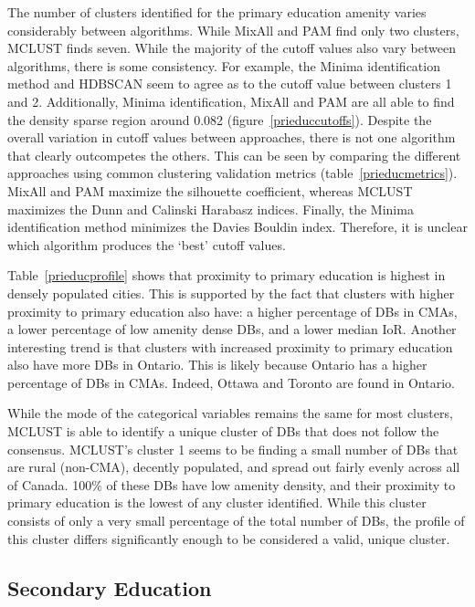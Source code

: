 \documentclass[11pt, a4paper]{article}
\begin{document}
The number of clusters identified for the primary education amenity varies considerably between algorithms. While MixAll and PAM find only two clusters, MCLUST finds seven. While the majority of the cutoff values also vary between algorithms, there is some consistency. For example, the Minima identification method and HDBSCAN seem to agree as to the cutoff value between clusters 1 and 2. Additionally, Minima identification, MixAll and PAM are all able to find the density sparse region around 0.082 (figure~\ref{prieduccutoffs}). Despite the overall variation in cutoff values between approaches, there is not one algorithm that clearly outcompetes the others. This can be seen by comparing the different approaches using common clustering validation metrics (table~\ref{prieducmetrics}). MixAll and PAM maximize the silhouette coefficient, whereas MCLUST maximizes the Dunn and Calinski Harabasz indices. Finally, the Minima identification method minimizes the Davies Bouldin index. Therefore, it is unclear which algorithm produces the `best' cutoff values.
\par
Table~\ref{prieducprofile} shows that proximity to primary education is highest in densely populated cities. This is supported by the fact that clusters with higher proximity to primary education also have: a higher percentage of DBs in CMAs, a lower percentage of low amenity dense DBs, and a lower median IoR. Another interesting trend is that clusters with increased proximity to primary education also have more DBs in Ontario. This is likely because Ontario has a higher percentage of DBs in CMAs. Indeed, Ottawa and Toronto are found in Ontario.
\par
While the mode of the categorical variables remains the same for most clusters, MCLUST is able to identify a unique cluster of DBs that does not follow the consensus. MCLUST’s cluster 1 seems to be finding a small number of DBs that are rural (non-CMA), decently populated, and spread out fairly evenly across all of Canada. 100\% of these DBs have low amenity density, and their proximity to primary education is the lowest of any cluster identified. While this cluster consists of only a very small percentage of the total number of DBs, the profile of this cluster differs significantly enough to be considered a valid, unique cluster.








\pagebreak
\justifying
\subsection{Secondary Education}
\end{document}
